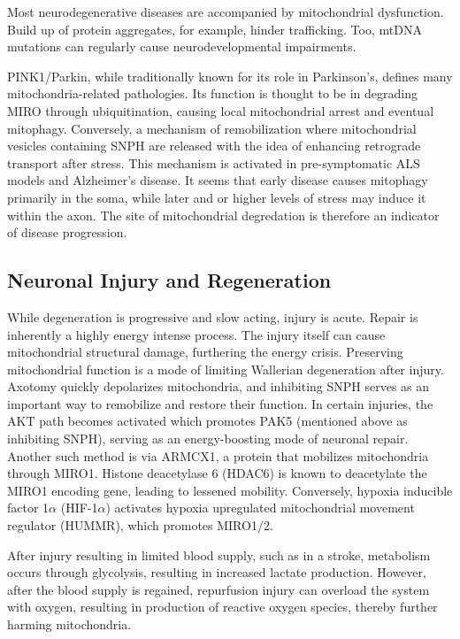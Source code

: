 \documentclass[12pt]{report}
\begin{document}
Most neurodegenerative diseases are accompanied by mitochondrial dysfunction. Build up of protein aggregates, for example, hinder trafficking. Too, mtDNA mutations can regularly cause neurodevelopmental impairments.\newline

PINK1/Parkin, while traditionally known for its role in Parkinson's, defines many mitochondria-related pathologies. Its function is thought to be in degrading MIRO through ubiquitination, causing local mitochondrial arrest and eventual mitophagy. Conversely, a mechanism of remobilization where mitochondrial vesicles containing SNPH are released with the idea of enhancing retrograde transport after stress. This mechanism is activated in pre-symptomatic ALS models and Alzheimer's disease. It seems that early disease causes mitophagy primarily in the soma, while later and or higher levels of stress may induce it within the axon. The site of mitochondrial degredation is therefore an indicator of disease progression. 

\subsection{Neuronal Injury and Regeneration}

While degeneration is progressive and slow acting, injury is acute. Repair is inherently a highly energy intense process. The injury itself can cause mitochondrial structural damage, furthering the energy crisis. Preserving mitochondrial function is a mode of limiting Wallerian degeneration after injury. Axotomy quickly depolarizes mitochondria, and inhibiting SNPH serves as an important way to remobilize and restore their function. In certain injuries, the AKT path becomes activated which promotes PAK5 (mentioned above as inhibiting SNPH), serving as an energy-boosting mode of neuronal repair. Another such method is via ARMCX1, a protein that mobilizes mitochondria through MIRO1. Histone deacetylase 6 (HDAC6) is known to deacetylate the MIRO1 encoding gene, leading to lessened mobility. Conversely, hypoxia inducible factor 1$\alpha$ (HIF-1$\alpha$) activates hypoxia upregulated mitochondrial movement regulator (HUMMR), which promotes MIRO1/2. \newline

After injury resulting in limited blood supply, such as in a stroke, metabolism occurs through glycolysis, resulting in increased lactate production. However, after the blood supply is regained, repurfusion injury can overload the system with oxygen, resulting in production of reactive oxygen species, thereby further harming mitochondria.\newline
\end{document}
